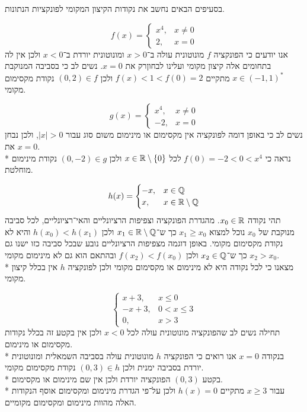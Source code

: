 \Question{}
בסעיפים הבאים נחשב את נקודות הקיצון המקומי לפונקציות הנתונות.

\Subquestion{}
\[
	f(x) = \begin{cases}
		x^4, & x \ne 0 \\
		2, & x = 0
	\end{cases}
\]
אנו יודעים כי הפונקציה $f$ מונוטונית עולה ב־$x > 0$ ומונוטונית יורדת ב־$x < 0$ ולכן אין לה בתחומים אלה קיצון מקומי ועלינו לבחוןרק את $x = 0$.
נשים לב כי בסביבה המנוקבת $x \in {(-1, 1)}^*$ מתקיים $f(x) < 1 < f(0) = 2$ ולכן $(0, 2) \in f$ נקודת מקסימום מקומי.

\Subquestion{}
\[
	g(x) = \begin{cases}
		x^4, & x \ne 0 \\
		-2, & x = 0
	\end{cases}
\]
נשים לב כי באופן דומה לפונקציה אין מקסימום או מינימום משום סוג עבור $|x| > 0$, ולכן נבחן את $x = 0$. \\*
נראה כי $f(0) = -2 < 0 < x^4$ לכל $x \in \mathbb{R}\setminus\{0\}$ ולכן $(0, -2) \in g$ נקודת מינימום מוחלטת.

\Subquestion{}
\[
	h(x) = \begin{cases}
		-x, & x \in \mathbb{Q} \\
		x, & x \in \mathbb{R} \setminus \mathbb{Q} \\
	\end{cases}
\]
תהי נקודה $x_0 \in \mathbb{R}$. מהגדרת הפונקציה וצפיפות הרציונליים והאי־רציונליים, לכל סביבה מנוקבת של $x_0$ נוכל למצוא $x_1 \ge x_0$ כך ש־$x_1 \in \mathbb{R} \setminus \mathbb{Q}$ ולכן $h(x_0) < h(x_1)$ והיא לא נקודת מקסימום מקומי.
באופן דוגמה מצפיפות הרציונליים נובע שבכל סביבה כזו ישנו גם $x_2 > x_0$ כך ש־$x_2 \in \mathbb{Q}$ ולכן $f(x_2) < f(x_0)$ ובהתאם הוא גם לא מינימום מקומי. \\*
מצאנו כי לכל נקודה היא לא מינימום או מקסימום מקומי ולכן לפונקציה $h$ אין בכלל קיצון מקומי.

\Subquestion{}
\[
	\begin{cases}
		x + 3, & x \le 0 \\
		-x + 3, & 0 < x \le 3 \\
		0, & x > 3
	\end{cases}
\]
תחילה נשים לב שהפונקציה מונוטונית עולה לכל $x < 0$ ולכן אין בקטע זה בכלל נקודות מקסימום או מינימום. \\*
בנקודה $x = 0$ אנו רואים כי הפונקציה $h$ מונוטונית עולה בסביבה השמאלית ומונוטונית יורדת בסביבה ימנית ולכן $(0, 3) \in h$ נקודת מקסימום מקומי. \\*
בקטע $(0, 3)$ הפונקציה יורדת ולכן אין שם מינימום או מקסימום. \\*
עבור $x \ge 3$ מתקיים $h(x) = 0$ ולכן על־פי הגדרת מינימום ומקסימום אוסף הנקודות האלה מהוות מינימום ומקסימום מקומיים.

